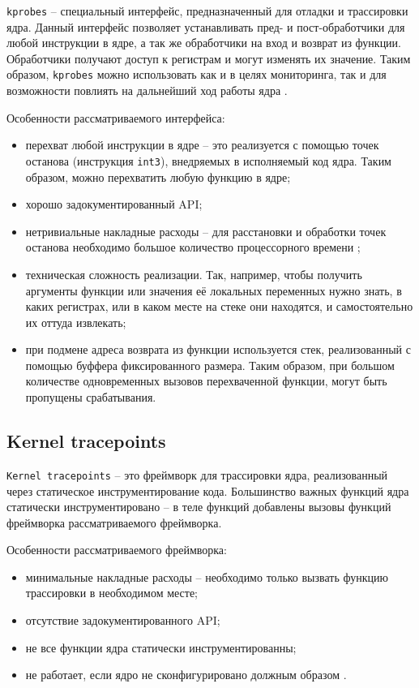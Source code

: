 \texttt{kprobes} \cite{kprobes} -- специальный интерфейс, предназначенный для отладки и трассировки ядра. Данный интерфейс позволяет устанавливать пред- и пост-обработчики для любой инструкции в ядре, а так же обработчики на вход и возврат из функции. Обработчики получают доступ к регистрам и могут изменять их значение. Таким образом, \texttt{kprobes} можно использовать как и в целях мониторинга, так и для возможности повлиять на дальнейший ход работы ядра \cite{habr-profiling-linux}.

Особенности рассматриваемого интерфейса:

\begin{itemize}
	\item перехват любой инструкции в ядре -- это реализуется с помощью точек останова (инструкция \texttt{int3}), внедряемых в исполняемый код ядра. Таким образом, можно перехватить любую функцию в ядре;
	\item хорошо задокументированный API;
	\item нетривиальные накладные расходы -- для расстановки и обработки точек останова необходимо большое количество процессорного времени \cite{habr-profiling-linux};
	\item техническая сложность реализации. Так, например, чтобы получить аргументы функции или значения её локальных переменных нужно знать, в каких регистрах, или в каком месте на стеке они находятся, и самостоятельно их оттуда извлекать;
	\item при подмене адреса возврата из функции используется стек, реализованный с помощью буффера фиксированного размера. Таким образом, при большом количестве одновременных вызовов перехваченной функции, могут быть пропущены срабатывания.
\end{itemize}

\subsection{Kernel tracepoints}

\texttt{Kernel tracepoints} \cite{kernel-tracepoints} -- это фреймворк для трассировки ядра, реализованный через статическое инструментирование кода. Большинство важных функций ядра статически инструментировано -- в теле функций добавлены вызовы функций фреймворка рассматриваемого фреймворка.

Особенности рассматриваемого фреймворка:

\begin{itemize}
	\item минимальные накладные расходы -- необходимо только вызвать функцию трассировки в необходимом месте;
	\item отсутствие задокументированного API;
	\item не все функции ядра статически инструментированны; 
	\item не работает, если ядро не сконфигурировано должным образом \cite{habr-profiling-linux}.
\end{itemize}


